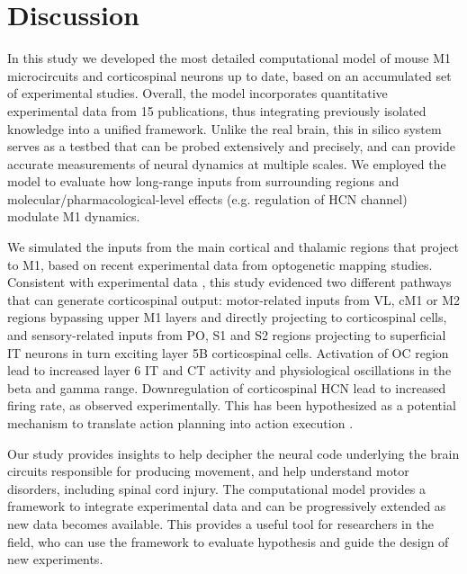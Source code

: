 \section{Discussion}
In this study we developed the most detailed computational model of mouse M1 microcircuits and corticospinal neurons up to date, based on an accumulated set of experimental studies. Overall, the model incorporates quantitative experimental data from 15 publications, thus integrating previously isolated knowledge into a unified framework. Unlike the real brain, this in silico system serves as a testbed that can be probed extensively and precisely, and can provide accurate measurements of neural dynamics at multiple scales. We employed the model to evaluate how long-range inputs from surrounding regions and molecular/pharmacological-level effects (e.g. regulation of HCN channel) modulate M1 dynamics. 

We simulated the inputs from the main cortical and thalamic regions that project to M1, based on recent experimental data from optogenetic mapping studies. Consistent with experimental data \cite{Hook13,Sute15}, this study evidenced two different pathways that can generate corticospinal output: motor-related inputs from VL, cM1 or M2 regions bypassing upper M1 layers and directly projecting to corticospinal cells, and sensory-related inputs from PO, S1 and S2 regions projecting to superficial IT neurons in turn exciting layer 5B corticospinal cells. Activation of OC region lead to increased layer 6 IT and CT activity and physiological oscillations in the beta and gamma range. Downregulation of corticospinal HCN lead to increased firing rate, as observed experimentally. This has been hypothesized as a potential mechanism to translate action planning into action execution \cite{Shee11}.

Our study provides insights to help decipher the neural code underlying the brain circuits responsible for producing movement, and help understand motor disorders, including spinal cord injury. The computational model provides a framework to integrate experimental data and can be progressively extended as new data becomes available. This provides a useful tool for researchers in the field, who can use the framework to evaluate hypothesis and guide the design of new experiments. 


